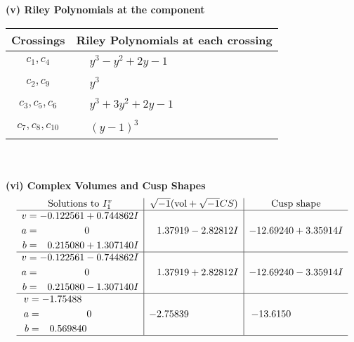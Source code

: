 \documentclass[1p]{elsarticle_modified}
\theoremstyle{definition}
\newcommand{\I}{\sqrt{-1}}
\begin{document}
\flushleft \textbf{(v) Riley Polynomials at the component}\newline \\
\begin{tabular}{m{50pt}|m{274pt}}
Crossings & \hspace{64pt}Riley Polynomials at each crossing \\
\hline $$\begin{aligned}c_{1},c_{4}\end{aligned}$$&$\begin{aligned}
&y^3- y^2+2 y-1
\end{aligned}$\\
\hline $$\begin{aligned}c_{2},c_{9}\end{aligned}$$&$\begin{aligned}
&y^3
\end{aligned}$\\
\hline $$\begin{aligned}c_{3},c_{5},c_{6}\end{aligned}$$&$\begin{aligned}
&y^3+3 y^2+2 y-1
\end{aligned}$\\
\hline $$\begin{aligned}c_{7},c_{8},c_{10}\end{aligned}$$&$\begin{aligned}
&(y-1)^3
\end{aligned}$\\
\hline
\end{tabular}\\~\\
\newpage\flushleft \textbf{(vi) Complex Volumes and Cusp Shapes}
$$\begin{array}{c|c|c}  
\text{Solutions to }I^v_{1}& \I (\text{vol} + \sqrt{-1}CS) & \text{Cusp shape}\\
 \hline 
\begin{aligned}
v &= -0.122561 + 0.744862 I \\
a &= \phantom{-0.000000 } 0 \\
b &= \phantom{-}0.215080 + 1.307140 I\end{aligned}
 & \phantom{-}1.37919 - 2.82812 I & -12.69240 + 3.35914 I \\ \hline\begin{aligned}
v &= -0.122561 - 0.744862 I \\
a &= \phantom{-0.000000 } 0 \\
b &= \phantom{-}0.215080 - 1.307140 I\end{aligned}
 & \phantom{-}1.37919 + 2.82812 I & -12.69240 - 3.35914 I \\ \hline\begin{aligned}
v &= -1.75488\phantom{ +0.000000I} \\
a &= \phantom{-0.000000 } 0 \\
b &= \phantom{-}0.569840\phantom{ +0.000000I}\end{aligned}
 & -2.75839\phantom{ +0.000000I} & -13.6150\phantom{ +0.000000I}\\
 \hline 
 \end{array}$$\newpage
\end{document}
